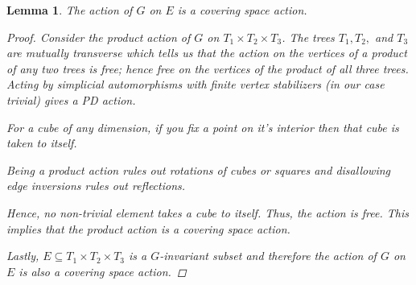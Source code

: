 \documentclass[12pt,parskip=full]{report}
\theoremstyle{plain}
\newtheorem{lem}[thm]{Lemma}
\theoremstyle{definition}
\begin{document}
\begin{lem}

    The action of \(G\) on \(E\) is a covering space action.
    
    \begin{proof}
        Consider the product action of \(G\) on \(T_1\times T_2\times T_3\). 
        The trees \(T_1, T_2,\) and \(T_3\) are mutually transverse which tells us that the action on the vertices of a product of any two trees is free; hence free on the vertices of the product of all three trees. Acting by simplicial automorphisms with finite vertex stabilizers (in our case trivial) gives a PD action. 
        
        For a cube of any dimension, if you fix a point on it's interior then that cube is taken to itself.
        
        Being a product action rules out rotations of cubes or squares and disallowing edge inversions rules out reflections.
        
        Hence, no non-trivial element takes a cube to itself. Thus, the action is free. This implies that the product action is a covering space action.
        
        Lastly, \(E\subseteq T_1\times T_2\times T_3\) is a \(G\)-invariant subset and therefore the action of \(G\) on \(E\) is also a covering space action.
    \end{proof}
\end{lem}
\end{document}
